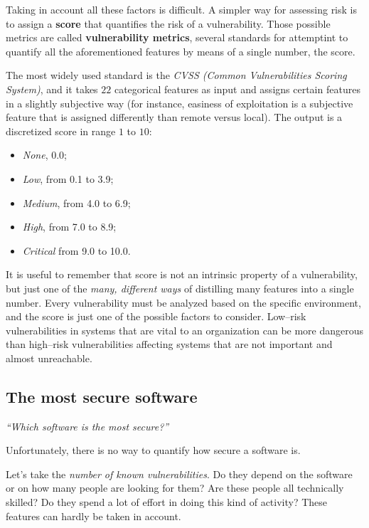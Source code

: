 \documentclass[10pt]{extbook}
\begin{document}
Taking in account all these factors is difficult. A simpler way for assessing
risk is to assign a \textbf{score} that quantifies the risk of a vulnerability.
Those possible metrics are called \textbf{vulnerability metrics}, several
standards for attemptint to quantify all the aforementioned features by means
of a single number, the score. 

The most widely used standard is the \emph{CVSS (Common Vulnerabilities Scoring
System)}, and it takes $22$ categorical features as input and assigns certain
features in a slightly subjective way (for instance, easiness of exploitation
is a subjective feature that is assigned differently than remote versus local).
The output is a discretized score in range $1$ to $10$:
\begin{itemize}
    \item \emph{None}, 0.0;
    \item \emph{Low}, from 0.1 to 3.9;
    \item \emph{Medium}, from 4.0 to 6.9;
    \item \emph{High}, from 7.0 to 8.9;
    \item \emph{Critical} from 9.0 to 10.0.
\end{itemize}

It is useful to remember that score is not an intrinsic property of a
vulnerability, but just one of the \emph{many, different ways} of distilling
many features into a single number. Every vulnerability must be analyzed based
on the specific environment, and the score is just one of the possible factors
to consider. Low--risk vulnerabilities in systems that are vital to an
organization can be more dangerous than high--risk vulnerabilities affecting
systems that are not important and almost unreachable.
\subsection{The most secure software}

\vspace*{1cm}
\begin{center}
\emph{``Which software is the most secure?''}
\end{center}
\vspace*{1cm}

Unfortunately, there is no way to quantify how secure a software is.

Let's take the \emph{number of known vulnerabilities}. Do they depend on the
software or on how many people are looking for them? Are these people all
technically skilled? Do they spend a lot of effort in doing this kind of
activity? These features can hardly be taken in account.
\end{document}
